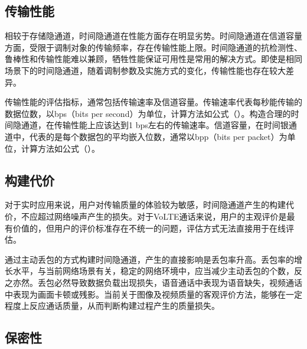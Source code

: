 \subsection{传输性能}
\label{chap:backinfo:metric:throughput}

相较于存储隐通道，时间隐通道在性能方面存在明显劣势。时间隐通道在信道容量方面，受限于调制对象的传输频率，存在传输性能上限。时间隐通道的抗检测性、鲁棒性和传输性能难以兼顾，牺牲性能保证可用性是常用的解决方式。即使是相同场景下的时间隐通道，随着调制参数及实施方式的变化，传输性能也存在较大差异。


传输性能的评估指标，通常包括传输速率及信道容量。传输速率代表每秒能传输的数据位数，以bps（bits per second）为单位，计算方法如公式（）。构造合理的时间隐通道，在传输性能上应该达到1 bps左右的传输速率。信道容量，在时间银通道中，代表的是每个数据包的平均嵌入位数，通常以bpp（bits per packet）为单位，计算方法如公式（）。

\subsection{构建代价}
\label{chap:backinfo:metric:cost}

对于实时应用来说，用户对传输质量的体验较为敏感，时间隐通道产生的构建代价，不应超过网络噪声产生的损失。对于VoLTE通话来说，用户的主观评价是最有价值的，但用户的评价标准存在不统一的问题，评估方式无法直接用于在线评估。

通过主动丢包的方式构建时间隐通道，产生的直接影响是丢包率升高。丢包率的增长水平，与当前网络场景有关，稳定的网络环境中，应当减少主动丢包的个数，反之亦然。丢包必然导致数据负载出现损失，语音通话中表现为语音缺失，视频通话中表现为画面卡顿或残影。当前关于图像及视频质量的客观评价方法，能够在一定程度上反应通话质量，从而判断构建过程产生的质量损失。

\subsection{保密性}
\label{chap:backinfo:metric:non-disclosure}


